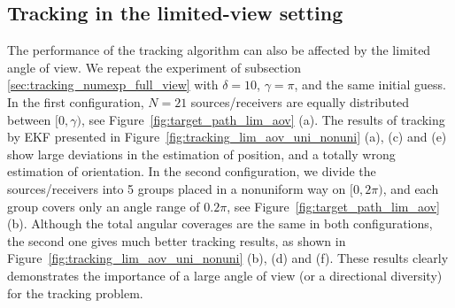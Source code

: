\subsection{Tracking in the limited-view setting}
\label{sec:tracking_numexp_partial_view}
The performance of the tracking algorithm can also be affected by
the limited angle of view. We repeat the experiment of subsection
\ref{sec:tracking_numexp_full_view} with $\delta=10$,
$\gamma=\pi$, and the same initial guess. In the first
configuration, $N=21$ sources/receivers are equally distributed
between $[0,\gamma)$, see Figure~\ref{fig:target_path_lim_aov} (a).
The results of tracking by EKF presented in
Figure~\ref{fig:tracking_lim_aov_uni_nonuni} (a), (c) and (e) show
large deviations in the estimation of position, and a totally
wrong estimation of orientation.  In the second configuration, we
divide the sources/receivers into 5 groups placed in a nonuniform
way on $[0, 2\pi)$, and each group covers only an angle range of
$0.2\pi$, see Figure~\ref{fig:target_path_lim_aov} (b). Although the
total angular coverages are the same in both configurations, the
second one gives much better tracking results, as shown in
Figure~\ref{fig:tracking_lim_aov_uni_nonuni} (b), (d) and (f). These
results clearly demonstrates the importance of a large angle of
view (or a directional diversity) for the tracking problem.



